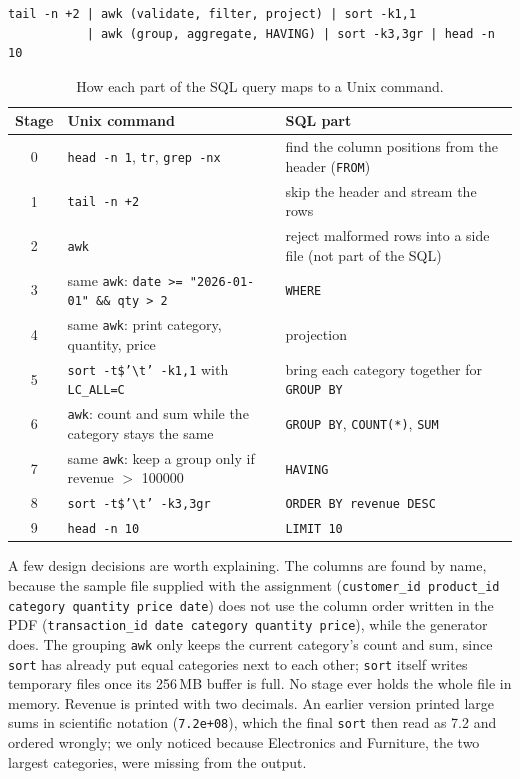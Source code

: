 \documentclass[11pt,a4paper]{article}
\newcommand{\file}[1]{\texttt{#1}}
\begin{document}
\begin{lstlisting}
tail -n +2 | awk (validate, filter, project) | sort -k1,1
           | awk (group, aggregate, HAVING) | sort -k3,3gr | head -n 10
\end{lstlisting}

\begin{table}[H]
\centering
\small
\begin{tabularx}{\textwidth}{@{}clX@{}}
\toprule
Stage & Unix command & SQL part \\
\midrule
0 & \file{head -n 1}, \file{tr}, \file{grep -nx} & find the column positions from the header (\texttt{FROM}) \\
1 & \file{tail -n +2} & skip the header and stream the rows \\
2 & \file{awk} & reject malformed rows into a side file (not part of the SQL) \\
3 & same \file{awk}: \file{date >= "2026-01-01" \&\& qty > 2} & \texttt{WHERE} \\
4 & same \file{awk}: print category, quantity, price & projection \\
5 & \file{sort -t\$'\textbackslash t' -k1,1} with \file{LC\_ALL=C} & bring each category together for \texttt{GROUP BY} \\
6 & \file{awk}: count and sum while the category stays the same & \texttt{GROUP BY}, \texttt{COUNT(*)}, \texttt{SUM} \\
7 & same \file{awk}: keep a group only if revenue $>$ 100000 & \texttt{HAVING} \\
8 & \file{sort -t\$'\textbackslash t' -k3,3gr} & \texttt{ORDER BY revenue DESC} \\
9 & \file{head -n 10} & \texttt{LIMIT 10} \\
\bottomrule
\end{tabularx}
\caption{How each part of the SQL query maps to a Unix command.}
\end{table}

A few design decisions are worth explaining. The columns are found by name,
because the sample file supplied with the assignment
(\file{customer\_id product\_id category quantity price date}) does not use
the column order written in the PDF (\file{transaction\_id date category
quantity price}), while the generator does. The grouping \file{awk} only keeps
the current category's count and sum, since \file{sort} has already put equal
categories next to each other; \file{sort} itself writes temporary files once
its 256\,MB buffer is full. No stage ever holds the whole file in memory.
Revenue is printed with two decimals. An earlier version printed large sums in
scientific notation (\file{7.2e+08}), which the final \file{sort} then read as
7.2 and ordered wrongly; we only noticed because Electronics and Furniture,
the two largest categories, were missing from the output.
\end{document}
